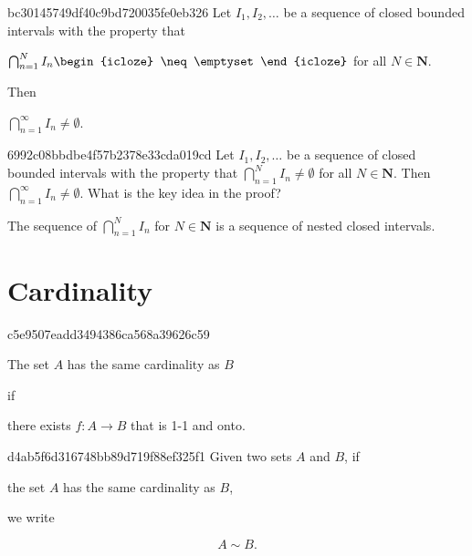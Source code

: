 \begin{note}{bc30145749df40c9bd720035fe0eb326}
    Let \({ I_1, I_2, \ldots }\) be a sequence of closed bounded intervals with the property that
    \begin{center}
        \({ \bigcap_{n = 1}^{N} I_n \begin{icloze}{2}\neq \emptyset\end{icloze} }\) for all \({ N \in \mathbf{N} }\).
    \end{center}
    Then \begin{icloze}{1}\({ \bigcap_{n = 1}^{\infty} I_n \neq \emptyset }\).\end{icloze}
\end{note}

\begin{note}{6992c08bbdbe4f57b2378e33cda019cd}
    Let \({ I_1, I_2, \ldots }\) be a sequence of closed bounded intervals with the property that \({ \bigcap_{n = 1}^{N} I_n \neq \emptyset }\) for all \({ N \in \mathbf{N} }\).
    Then \({ \bigcap_{n = 1}^{\infty} I_n \neq \emptyset }\).
    What is the key idea in the proof?

    \begin{cloze}{1}
        The sequence of \({ \bigcap_{n = 1}^{N} I_n }\) for \({ N \in \mathbf{N} }\) is a sequence of nested closed intervals.
    \end{cloze}
\end{note}

\section{Cardinality}
\begin{note}{c5e9507eadd3494386ca568a39626c59}
    \begin{icloze}{2}The set \({ A }\) has the same cardinality as \({ B }\)\end{icloze} if \begin{icloze}{1}there exists \({ f : A \to B }\) that is 1-1 and onto.\end{icloze}
\end{note}

\begin{note}{d4ab5f6d316748bb89d719f88ef325f1}
    Given two sets \({ A }\) and \({ B }\), if \begin{icloze}{2}the set \({ A }\) has the same cardinality as \({ B }\),\end{icloze} we write
    \begin{icloze}{1}
        \[
            A \sim B.
        \]
    \end{icloze}
\end{note}

